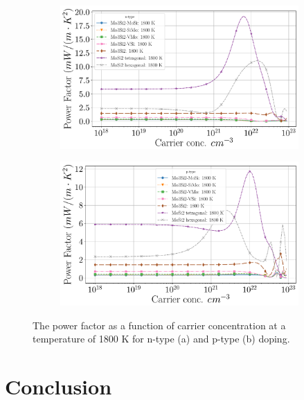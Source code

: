 \documentclass[7.5pt]{article}
\theoremstyle{plain}
\theoremstyle{definition}
\newcommand{\<}{\langle}
\renewcommand{\>}{\rangle}
\begin{document}
\begin{figure}
\centering
\begin{subfigure}{.5\textwidth}
  \centering
  \includegraphics[width=\linewidth]{allmats_Po_doping_temp_n}
  \caption{}
  \label{fig:sub1}
\end{subfigure}%
\begin{subfigure}{.5\textwidth}
  \centering
  \includegraphics[width=\linewidth]{allmats_Po_doping_temp_p}
  \caption{}
  \label{fig:sub2}
\end{subfigure}
\caption{The power factor as a function of carrier concentration at a temperature of 1800 K for n-type (a) and p-type (b) doping.}
\label{fig:Po-doping}
\end{figure}

\clearpage
\section{Conclusion}
\end{document}
